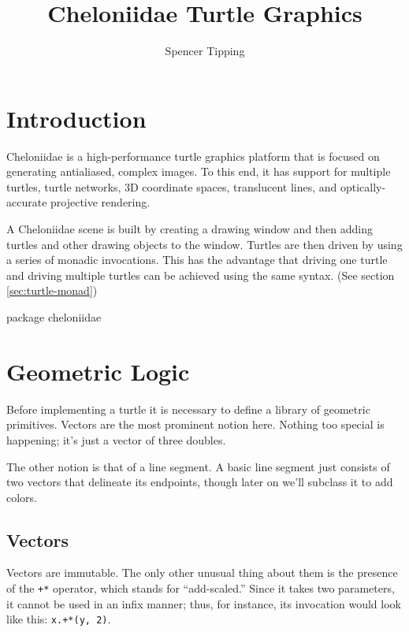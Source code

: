 \documentclass{article}
\title{Cheloniidae Turtle Graphics}
\author{Spencer Tipping}
\begin{document}
  \maketitle

  \tableofcontents

  \section{Introduction}
    \label{sec:introduction}

    Cheloniidae is a high-performance turtle graphics platform that is focused on generating antialiased, complex images. To this end, it has support for
    multiple turtles, turtle networks, 3D coordinate spaces, translucent lines, and optically-accurate projective rendering.

    A Cheloniidae scene is built by creating a drawing window and then adding turtles and other drawing objects to the window. Turtles are then driven by using
    a series of monadic invocations. This has the advantage that driving one turtle and driving multiple turtles can be achieved using the same syntax. (See
    section \ref{sec:turtle-monad})

    \begin{scalacode}
package cheloniidae
    \end{scalacode}

  \section{Geometric Logic}
    \label{sec:geometric-logic}

    Before implementing a turtle it is necessary to define a library of geometric primitives. Vectors are the most prominent notion here. Nothing too special is
    happening; it's just a vector of three doubles.

    The other notion is that of a line segment. A basic line segment just consists of two vectors that delineate its endpoints, though later on we'll subclass
    it to add colors.

    \subsection{Vectors}
      \label{sec:vectors}

      Vectors are immutable. The only other unusual thing about them is the presence of the {\tt +*} operator, which stands for ``add-scaled.'' Since it takes
      two parameters, it cannot be used in an infix manner; thus, for instance, its invocation would look like this: {\tt x.+*(y, 2)}.
\end{document}
